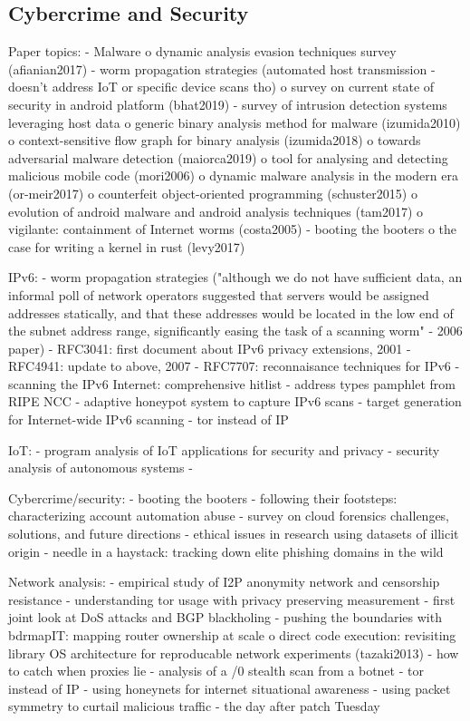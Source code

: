 \documentclass[10pt,sigconf]{acmart}
\begin{document}
\subsection{Cybercrime and Security}
\label{cybersecurity}

Paper topics:
- Malware
	o dynamic analysis evasion techniques survey (afianian2017)
	- worm propagation strategies (automated host transmission - doesn't address IoT or specific device scans tho)
	o survey on current state of security in android platform (bhat2019)
	- survey of intrusion detection systems leveraging host data
	o generic binary analysis method for malware (izumida2010)
	o context-sensitive flow graph for binary analysis (izumida2018)
	o towards adversarial malware detection (maiorca2019)
	o tool for analysing and detecting malicious mobile code (mori2006)
	o dynamic malware analysis in the modern era (or-meir2017)
	o counterfeit object-oriented programming (schuster2015)
	o evolution of android malware and android analysis techniques (tam2017)
	o vigilante: containment of Internet worms (costa2005)
	- booting the booters
	o the case for writing a kernel in rust (levy2017)

IPv6:
	- worm propagation strategies ("although we do not have sufficient data, an informal poll of network operators suggested that servers would be assigned addresses statically, and that these addresses would be located in the low end of the subnet address range, significantly easing the task of a scanning worm" - 2006 paper)
	- RFC3041: first document about IPv6 privacy extensions, 2001
	- RFC4941: update to above, 2007
	- RFC7707: reconnaisance techniques for IPv6
	- scanning the IPv6 Internet: comprehensive hitlist
	- address types pamphlet from RIPE NCC
	- adaptive honeypot system to capture IPv6 scans
	- target generation for Internet-wide IPv6 scanning
	- tor instead of IP

IoT:
	- program analysis of IoT applications for security and privacy
	- security analysis of autonomous systems
	- 

Cybercrime/security:
	- booting the booters
	- following their footsteps: characterizing account automation abuse
	- survey on cloud forensics challenges, solutions, and future directions
	- ethical issues in research using datasets of illicit origin
	- needle in a haystack: tracking down elite phishing domains in the wild

Network analysis:
	- empirical study of I2P anonymity network and censorship resistance
	- understanding tor usage with privacy preserving measurement
	- first joint look at DoS attacks and BGP blackholing
	- pushing the boundaries with bdrmapIT: mapping router ownership at scale
	o direct code execution: revisiting library OS architecture for reproducable network experiments (tazaki2013)
	- how to catch when proxies lie
	- analysis of a /0 stealth scan from a botnet
	- tor instead of IP
	- using honeynets for internet situational awareness
	- using packet symmetry to curtail malicious traffic
	- the day after patch Tuesday
\end{document}
